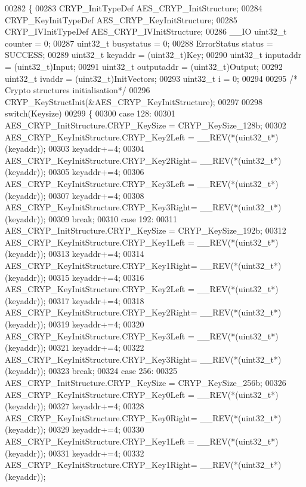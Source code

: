 \begin{DoxyCode}
00282 \{
00283   CRYP_InitTypeDef AES\_CRYP\_InitStructure;
00284   CRYP_KeyInitTypeDef AES\_CRYP\_KeyInitStructure;
00285   CRYP_IVInitTypeDef AES\_CRYP\_IVInitStructure;
00286   \_\_IO uint32\_t counter = 0;
00287   uint32\_t busystatus = 0;
00288   ErrorStatus status = SUCCESS;
00289   uint32\_t keyaddr    = (uint32\_t)Key;
00290   uint32\_t inputaddr  = (uint32\_t)Input;
00291   uint32\_t outputaddr = (uint32\_t)Output;
00292   uint32\_t ivaddr     = (uint32\_t)InitVectors;
00293   uint32\_t i = 0;
00294 
00295   \textcolor{comment}{/* Crypto structures initialisation*/}
00296   CRYP_KeyStructInit(&AES\_CRYP\_KeyInitStructure);
00297 
00298   \textcolor{keywordflow}{switch}(Keysize)
00299   \{
00300     \textcolor{keywordflow}{case} 128:
00301     AES\_CRYP\_InitStructure.CRYP_KeySize = CRYP_KeySize_128b;
00302     AES\_CRYP\_KeyInitStructure.CRYP_Key2Left = \_\_REV(*(uint32\_t*)(keyaddr));
00303     keyaddr+=4;
00304     AES\_CRYP\_KeyInitStructure.CRYP_Key2Right= \_\_REV(*(uint32\_t*)(keyaddr));
00305     keyaddr+=4;
00306     AES\_CRYP\_KeyInitStructure.CRYP_Key3Left = \_\_REV(*(uint32\_t*)(keyaddr));
00307     keyaddr+=4;
00308     AES\_CRYP\_KeyInitStructure.CRYP_Key3Right= \_\_REV(*(uint32\_t*)(keyaddr));
00309     \textcolor{keywordflow}{break};
00310     \textcolor{keywordflow}{case} 192:
00311     AES\_CRYP\_InitStructure.CRYP_KeySize  = CRYP_KeySize_192b;
00312     AES\_CRYP\_KeyInitStructure.CRYP_Key1Left = \_\_REV(*(uint32\_t*)(keyaddr));
00313     keyaddr+=4;
00314     AES\_CRYP\_KeyInitStructure.CRYP_Key1Right= \_\_REV(*(uint32\_t*)(keyaddr));
00315     keyaddr+=4;
00316     AES\_CRYP\_KeyInitStructure.CRYP_Key2Left = \_\_REV(*(uint32\_t*)(keyaddr));
00317     keyaddr+=4;
00318     AES\_CRYP\_KeyInitStructure.CRYP_Key2Right= \_\_REV(*(uint32\_t*)(keyaddr));
00319     keyaddr+=4;
00320     AES\_CRYP\_KeyInitStructure.CRYP_Key3Left = \_\_REV(*(uint32\_t*)(keyaddr));
00321     keyaddr+=4;
00322     AES\_CRYP\_KeyInitStructure.CRYP_Key3Right= \_\_REV(*(uint32\_t*)(keyaddr));
00323     \textcolor{keywordflow}{break};
00324     \textcolor{keywordflow}{case} 256:
00325     AES\_CRYP\_InitStructure.CRYP_KeySize  = CRYP_KeySize_256b;
00326     AES\_CRYP\_KeyInitStructure.CRYP_Key0Left = \_\_REV(*(uint32\_t*)(keyaddr));
00327     keyaddr+=4;
00328     AES\_CRYP\_KeyInitStructure.CRYP_Key0Right= \_\_REV(*(uint32\_t*)(keyaddr));
00329     keyaddr+=4;
00330     AES\_CRYP\_KeyInitStructure.CRYP_Key1Left = \_\_REV(*(uint32\_t*)(keyaddr));
00331     keyaddr+=4;
00332     AES\_CRYP\_KeyInitStructure.CRYP_Key1Right= \_\_REV(*(uint32\_t*)(keyaddr));

\end{DoxyCode}
